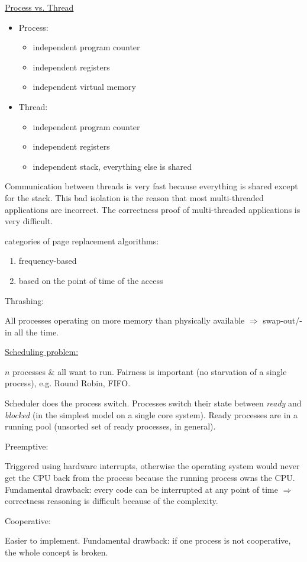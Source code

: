 \par{
	\noindent\underline{Process vs. Thread}
	\parskip0pt\begin{itemize}
		\item{
			Process:
			\parskip0pt\begin{itemize}
				\item{independent program counter}
				\item{independent registers}
				\item{independent virtual memory}
			\end{itemize}
		}
		\item{
			Thread:
			\parskip0pt\begin{itemize}
				\item{independent program counter}
				\item{independent registers}
				\item{independent stack, everything else is shared}
			\end{itemize}
		}
	\end{itemize}
	\par{
		\noindent
		Communication between threads is very fast because everything is shared except for the stack. This bad isolation is the reason that most multi-threaded applications are incorrect. The correctness proof of multi-threaded applications is very difficult.
	}
}
\par{
	 categories of page replacement algorithms:
	\begin{enumerate}
		\item{frequency-based}
		\item{based on the point of time of the access}
	\end{enumerate}
}
\par{
	\noindent Thrashing:
	\par{
		\noindent
		All processes operating on more memory than physically available $\Rightarrow$ swap-out/-in all the time. 
	}
}
\par{
	\noindent\underline{Scheduling problem:}
	\par{
		\noindent
		$n$ processes \& all want to run. Fairness is important (no starvation of a single process), e.g. Round Robin, FIFO.
	}
	\par{
		\noindent
		Scheduler does the process switch. Processes switch their state between \textit{ready} and \textit{blocked} (in the simplest model on a single core system). Ready processes are in a running pool (unsorted set of ready processes, in general).
	}
	\par{
		\noindent
		Preemptive:
		\par{
			\noindent
			Triggered using hardware interrupts, otherwise the operating system would never get the CPU back from the process because the running process owns the CPU. Fundamental drawback: every code can be interrupted at any point of time $\Rightarrow$ correctness reasoning is difficult because of the complexity.
		}
	}
	\par{
		\noindent
		Cooperative:
		\par{
			\noindent
			Easier to implement. Fundamental drawback: if one process is not cooperative, the whole concept is broken.
		}
	}
}